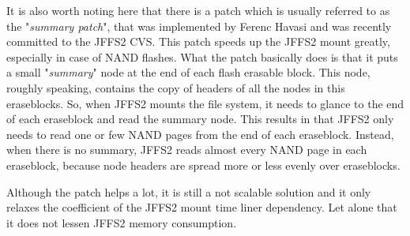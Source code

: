 It is also worth noting here that there is a patch which is usually referred to
as the "\emph{summary patch}", that was implemented by Ferenc Havasi and was
recently committed to the JFFS2 CVS. This patch speeds up the JFFS2 mount
greatly, especially in case of NAND flashes. What the patch basically does is
that it puts a small "\emph{summary}" node at the end of each flash erasable
block. This node, roughly speaking, contains the copy of headers of all the
nodes in this eraseblocks. So, when JFFS2 mounts the file system, it needs to
glance to the end of each eraseblock and read the summary node. This results in
that JFFS2 only needs to read one or few NAND pages from the end of each
eraseblock. Instead, when there is no summary, JFFS2 reads almost every NAND
page in each eraseblock, because node headers are spread more or less evenly
over eraseblocks.

Although the patch helps a lot, it is still a not scalable solution and it only
relaxes the coefficient of the JFFS2 mount time liner dependency. Let alone
that it does not lessen JFFS2 memory consumption.
